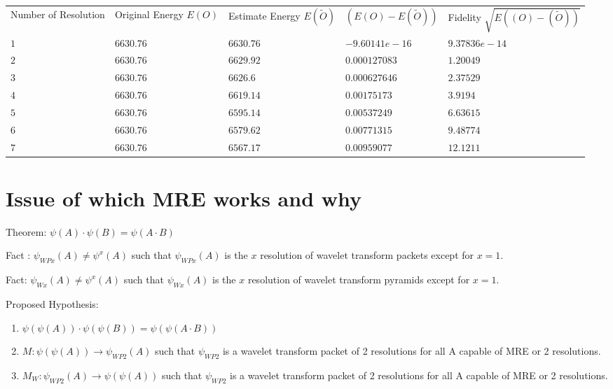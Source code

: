 \documentclass[11pt]{article}
\begin{document}
\begin{tabular}{lllll}
{\tiny Number of Resolution} & {\tiny Original Energy }$E(O)$ & {\tiny 
Estimate Energy }$E(\widetilde{O})$ & $(E(O)-E(\widetilde{O}))$ & {\tiny 
Fidelity }$\sqrt{E((O)-(\widetilde{O}))}$ \\ 
$1$&  $6630.76$ & $6630.76$ & $-9.60141e-16$  &  $9.37836e-14$ \\ 
$2$& $6630.76$ & $6629.92$ & $0.000127083$  &  $1.20049$ \\ 
$3$& $6630.76$ & $6626.6$  & $0.000627646$ & $2.37529$ \\ 
$4$& $6630.76$ & $6619.14$  & $0.00175173$ & $3.9194$ \\ 
$5$& $6630.76$ & $6595.14$ &  $0.00537249$ &  $6.63615$\\ 
$6$& $6630.76$ & $6579.62$ & $0.00771315$ & $9.48774$ \\ 
$7$& $6630.76$ & $6567.17$ & $0.00959077$ &  $12.1211$
\end{tabular}


\section {Issue of which MRE works and why}

Theorem:  $\psi(A) \cdot \psi(B) = \psi (A\cdot B) $

Fact :  $\psi_{WPx} (A) \not= \psi^x(A) $  such that $\psi_{WPx} (A) $ is the $x$ resolution of wavelet transform packets except for $x=1$.

Fact:  $\psi_{Wx} (A) \not= \psi^x(A) $  such that $\psi_{Wx} (A) $ is the $x$ resolution of wavelet transform pyramids except for $x=1$.

Proposed Hypothesis: 
 \begin{enumerate}
\item  $ \psi (\psi(A)) \cdot \psi (\psi (B)) = \psi ( \psi (A\cdot B)) $ 
 \item $M:\psi (\psi (A)) \to \psi_{WP2} (A) $ such that $\psi_{WP2}$ is a wavelet transform packet of 2 resolutions for all A capable of MRE or 2 resolutions.  
 \item $M_W:\psi_{WP2} (A)  \to \psi (\psi (A)) $ such that $\psi_{WP2}$ is a wavelet transform packet of 2 resolutions for all A capable of MRE or 2 resolutions.  
\end{enumerate}






 
\end{document}
